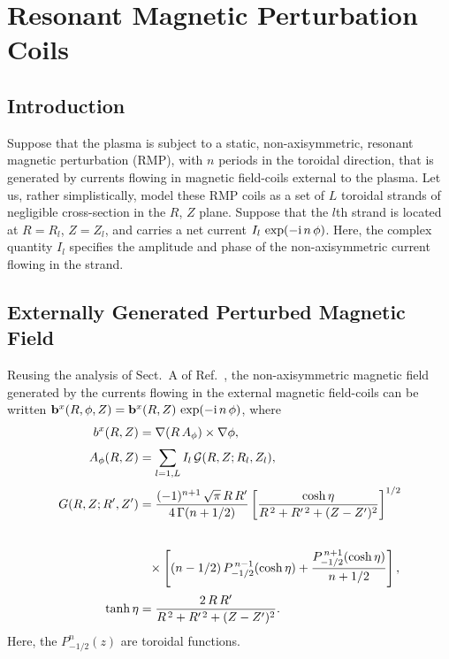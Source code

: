 \documentclass[12pt,prb,aps]{revtex4-1}
\begin{document}
\section{Resonant Magnetic Perturbation Coils}\label{rmp}

\subsection{Introduction}
Suppose that the plasma is subject to a static, non-axisymmetric, resonant magnetic perturbation (RMP),
with $n$ periods in the toroidal direction, that is  generated by currents flowing in magnetic
field-coils external to the plasma. Let us, rather simplistically, model these RMP coils as a set of $L$ toroidal strands of negligible cross-section in the
$R$, $Z$ plane. Suppose that the $l$th strand is located at $R=R_l$, $Z=Z_l$, and carries a net current $I_l\,\exp(-{\rm i}\,n\,\phi)$. Here, the
complex quantity $I_l$ specifies the amplitude and phase of the non-axisymmetric current flowing in the strand. 

\subsection{Externally Generated Perturbed Magnetic Field}
Reusing the analysis of Sect.~A of Ref.~, the non-axisymmetric magnetic field generated by the currents flowing in the external magnetic
field-coils can be written ${\bf b}^x(R,\phi,Z)= {\bf b}^x(R,Z)\,\exp(-{\rm i}\,n\,\phi)$, where
\begin{align}\label{e313}
b^x(R,Z)&= \nabla(R\,A_\phi)\times\nabla\phi,\\[0.5ex]
A_\phi(R,Z)&= \sum_{l=1,L} I_l\,{\cal G}(R,Z;R_l,Z_l),\\[0.5ex]
G(R,Z;R',Z') &= \frac{(-1)^{n+1}\,\sqrt{\pi}\, R\,R'}{4\,\Gamma(n+1/2)}\left[\frac{\cosh\eta}{R^{\,2}+R'^{\,2}+(Z-Z')^2}\right]^{1/2}\nonumber\\[0.5ex]
\nonumber\\[0.5ex]&\phantom{=}\times
\left[(n-1/2)\,P_{-1/2}^{\,n-1}(\cosh\eta) + \frac{P_{-1/2}^{\,n+1}(\cosh\eta)}{n+1/2}\right],\\[0.5ex]
\tanh\eta &= \frac{2\,R\,R'}{R^{\,2} + R'^{\,2}+(Z-Z')^2}.
\end{align}
Here, the $P_{-1/2}^n(z)$ are toroidal functions.\cite{abrama}
\end{document}
